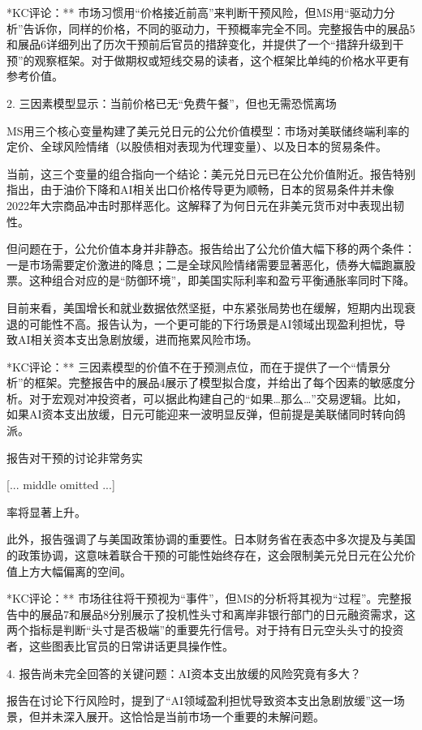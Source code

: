 \documentclass[11pt]{ctexart}
\begin{document}
*KC评论：** 市场习惯用“价格接近前高”来判断干预风险，但MS用“驱动力分析”告诉你，同样的价格，不同的驱动力，干预概率完全不同。完整报告中的展品5和展品6详细列出了历次干预前后官员的措辞变化，并提供了一个“措辞升级到干预”的观察框架。对于做期权或短线交易的读者，这个框架比单纯的价格水平更有参考价值。

2. 三因素模型显示：当前价格已无“免费午餐”，但也无需恐慌离场

MS用三个核心变量构建了美元兑日元的公允价值模型：市场对美联储终端利率的定价、全球风险情绪（以股债相对表现为代理变量）、以及日本的贸易条件。

当前，这三个变量的组合指向一个结论：美元兑日元已在公允价值附近。报告特别指出，由于油价下降和AI相关出口价格传导更为顺畅，日本的贸易条件并未像2022年大宗商品冲击时那样恶化。这解释了为何日元在非美元货币对中表现出韧性。

但问题在于，公允价值本身并非静态。报告给出了公允价值大幅下移的两个条件：一是市场需要定价激进的降息；二是全球风险情绪需要显著恶化，债券大幅跑赢股票。这种组合对应的是“防御环境”，即美国实际利率和盈亏平衡通胀率同时下降。

目前来看，美国增长和就业数据依然坚挺，中东紧张局势也在缓解，短期内出现衰退的可能性不高。报告认为，一个更可能的下行场景是AI领域出现盈利担忧，导致AI相关资本支出急剧放缓，进而拖累风险市场。

*KC评论：** 三因素模型的价值不在于预测点位，而在于提供了一个“情景分析”的框架。完整报告中的展品4展示了模型拟合度，并给出了每个因素的敏感度分析。对于宏观对冲投资者，可以据此构建自己的“如果…那么…”交易逻辑。比如，如果AI资本支出放缓，日元可能迎来一波明显反弹，但前提是美联储同时转向鸽派。

报告对干预的讨论非常务实

[... middle omitted ...]

率将显著上升。

此外，报告强调了与美国政策协调的重要性。日本财务省在表态中多次提及与美国的政策协调，这意味着联合干预的可能性始终存在，这会限制美元兑日元在公允价值上方大幅偏离的空间。

*KC评论：** 市场往往将干预视为“事件”，但MS的分析将其视为“过程”。完整报告中的展品7和展品8分别展示了投机性头寸和离岸非银行部门的日元融资需求，这两个指标是判断“头寸是否极端”的重要先行信号。对于持有日元空头头寸的投资者，这些图表比官员的日常讲话更具操作性。

4. 报告尚未完全回答的关键问题：AI资本支出放缓的风险究竟有多大？

报告在讨论下行风险时，提到了“AI领域盈利担忧导致资本支出急剧放缓”这一场景，但并未深入展开。这恰恰是当前市场一个重要的未解问题。
\end{document}
